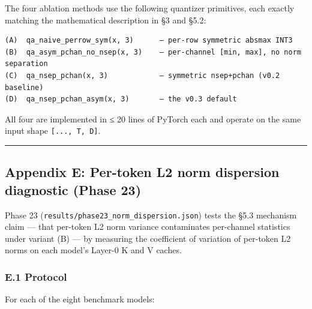 \documentclass[
]{article}
\begin{document}
The four ablation methods use the following quantizer primitives, each
exactly matching the mathematical description in §3 and §5.2:

\begin{verbatim}
(A)  qa_naive_perrow_sym(x, 3)      — per-row symmetric absmax INT3
(B)  qa_asym_pchan_no_nsep(x, 3)    — per-channel [min, max], no norm separation
(C)  qa_nsep_pchan(x, 3)            — symmetric nsep+pchan (v0.2 baseline)
(D)  qa_nsep_pchan_asym(x, 3)       — the v0.3 default
\end{verbatim}

All four are implemented in ≤ 20 lines of PyTorch each and operate on
the same input shape \texttt{{[}...,\ T,\ D{]}}.

\begin{center}\rule{0.5\linewidth}{0.5pt}\end{center}

\subsection{Appendix E: Per-token L2 norm dispersion diagnostic (Phase
23)}\label{appendix-e-per-token-l2-norm-dispersion-diagnostic-phase-23}

Phase 23 (\texttt{results/phase23\_norm\_dispersion.json}) tests the
§5.3 mechanism claim --- that per-token L2 norm variance contaminates
per-channel statistics under variant (B) --- by measuring the
coefficient of variation of per-token L2 norms on each model's Layer-0 K
and V caches.

\subsubsection{E.1 Protocol}\label{e.1-protocol}

For each of the eight benchmark models:
\end{document}
